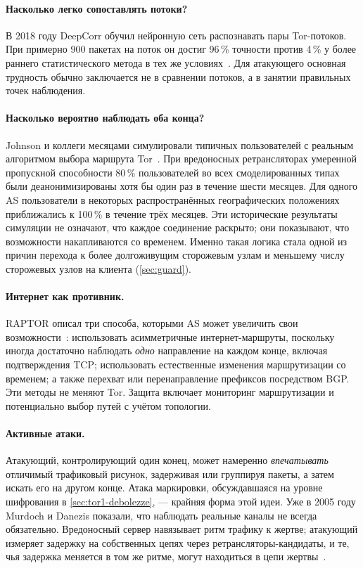 \paragraph{Насколько легко сопоставлять потоки?} В 2018 году DeepCorr обучил нейронную сеть распознавать пары Tor-потоков. При примерно 900 пакетах на поток он достиг 96\,\% точности против 4\,\% у более раннего статистического метода в тех же условиях~\cite{nasr2018deepcorr}. Для атакующего основная трудность обычно заключается не в сравнении потоков, а в занятии правильных точек наблюдения.

\paragraph{Насколько вероятно наблюдать оба конца?} Johnson и коллеги месяцами симулировали типичных пользователей с реальным алгоритмом выбора маршрута Tor~\cite{johnson2013users}. При вредоносных ретрансляторах умеренной пропускной способности 80\,\% пользователей во всех смоделированных типах были деанонимизированы хотя бы один раз в течение шести месяцев. Для одного AS пользователи в некоторых распространённых географических положениях приближались к 100\,\% в течение трёх месяцев. Эти исторические результаты симуляции не означают, что каждое соединение раскрыто; они показывают, что возможности накапливаются со временем. Именно такая логика стала одной из причин перехода к более долгоживущим сторожевым узлам и меньшему числу сторожевых узлов на клиента (\cref{sec:guard}).

\paragraph{Интернет как противник.} RAPTOR описал три способа, которыми AS может увеличить свои возможности~\cite{sun2015raptor}: использовать асимметричные интернет-маршруты, поскольку иногда достаточно наблюдать \emph{одно} направление на каждом конце, включая подтверждения TCP; использовать естественные изменения маршрутизации со временем; а также перехват или перенаправление префиксов посредством BGP. Эти методы не меняют Tor. Защита включает мониторинг маршрутизации и потенциально выбор путей с учётом топологии.

\paragraph{Активные атаки.} Атакующий, контролирующий один конец, может намеренно \emph{впечатывать} отличимый трафиковый рисунок, задерживая или группируя пакеты, а затем искать его на другом конце. Атака маркировки, обсуждавшаяся на уровне шифрования в \cref{sec:tor1-debolezze}, — крайняя форма этой идеи. Уже в 2005 году Murdoch и Danezis показали, что наблюдать реальные каналы не всегда обязательно. Вредоносный сервер навязывает ритм трафику к жертве; атакующий измеряет задержку на собственных цепях через ретрансляторы-кандидаты, и те, чья задержка меняется в том же ритме, могут находиться в цепи жертвы~\cite{murdoch2005lowcost}.

